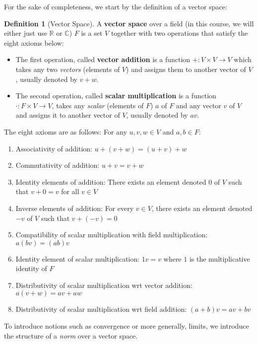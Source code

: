 \documentclass[a4paper, 11pt]{book}
\theoremstyle{definition}
\newtheorem{definition}{Definition}[section]
\theoremstyle{remark}
\begin{document}
    For the sake of completeness, we start by the definition of a vector space:
    \begin{definition}[Vector Space]
        A \textbf{vector space} over a field (in this course, we will either just use $\mathbb{R}$ or $\mathbb{C}$) $F$ is a set
        $V$ together with two operations that satisfy the eight axioms below:
        \begin{itemize}
            \item The first operation, called \textbf{vector addition} is a function $+: V \times V \to V$ which takes any two
                \textit{vectors} (elements of $V$) and assigns them to another vector of $V$, usually denoted by $v+w$.
            \item The second operation, called \textbf{scalar multiplication} is a function $\cdot: F\times V\to V$, takes any
                \textit{scalar} (elements of $F$) $a$ of $F$ and any vector $v$ of $V$ and assigns it to another vector of $V$, usually
                denoted by $av$.
        \end{itemize}
        The eight axioms are as follows: For any $u,v,w\in V$ and $a,b\in F$:
        \begin{enumerate}
            \item Associativity of addition: $u + (v + w) = (u + v) + w$
            \item Commutativity of addition: $u + v = v + w$
            \item Identity elements of addition: There exists an element denoted $0$ of $V$ such that $v+0 = v$ for all $v\in V$
            \item Inverse elements of addition: For every $v\in V$, there exists an element denoted $-v$ of $V$ such that $v + (-v) = 0$
            \item Compatibility of scalar multiplication with field multiplication: $a(bv) = (ab)v$
            \item Identity element of scalar multiplication: $1v = v$ where $1$ is the multiplicative identity of $F$
            \item Distributivity of scalar multiplication wrt vector addition: $a(v+w) = av+aw$
            \item Distributivity of scalar multiplication wrt field addition: $(a+b)v = av + bv$
        \end{enumerate}
    \end{definition}

    To introduce notions such as convergence or more generally, limits, we introduce the structure of a \textit{norm} over a vector
    space.
\end{document}
